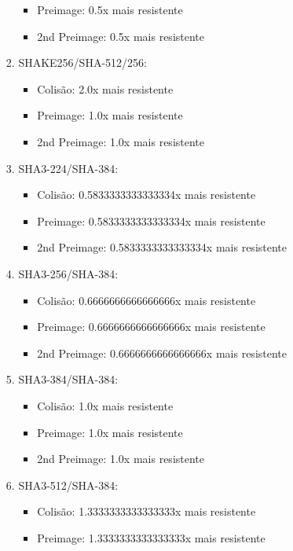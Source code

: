 \documentclass[12pt, a4paper]{article}
\begin{document}
\begin{enumerate}
\begin{enumerate}
\begin{enumerate}
\begin{itemize}
 \item Preimage: 0.5x mais resistente

 \item 2nd Preimage: 0.5x mais resistente
 \end{itemize}
\item SHAKE256/SHA-512/256:
 \begin{itemize}
 \item Colisão: 2.0x mais resistente

 \item Preimage: 1.0x mais resistente

 \item 2nd Preimage: 1.0x mais resistente
 \end{itemize}
\item SHA3-224/SHA-384:
 \begin{itemize}
 \item Colisão: 0.5833333333333334x mais resistente

 \item Preimage: 0.5833333333333334x mais resistente

 \item 2nd Preimage: 0.5833333333333334x mais resistente
 \end{itemize}
\item SHA3-256/SHA-384:
 \begin{itemize}
 \item Colisão: 0.6666666666666666x mais resistente

 \item Preimage: 0.6666666666666666x mais resistente

 \item 2nd Preimage: 0.6666666666666666x mais resistente
 \end{itemize}
\item SHA3-384/SHA-384:
 \begin{itemize}
 \item Colisão: 1.0x mais resistente

 \item Preimage: 1.0x mais resistente

 \item 2nd Preimage: 1.0x mais resistente
 \end{itemize}
\item SHA3-512/SHA-384:
 \begin{itemize}
 \item Colisão: 1.3333333333333333x mais resistente

 \item Preimage: 1.3333333333333333x mais resistente


\end{itemize}
\end{enumerate}
\end{enumerate}
\end{enumerate}
\end{document}
